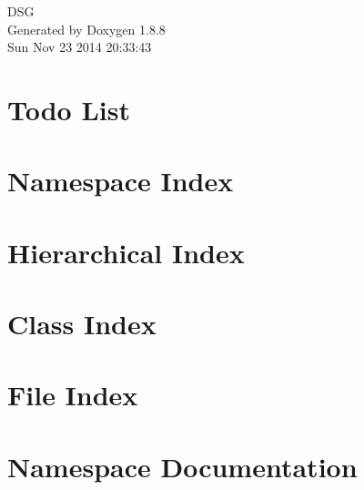 \documentclass[twoside]{book}
\newcommand{\+}{\discretionary{\mbox{\scriptsize$\hookleftarrow$}}{}{}}
\newcommand{\clearemptydoublepage}{%
  \newpage{\pagestyle{empty}\cleardoublepage}%
}
\begin{document}
\hypersetup{pageanchor=false,
             bookmarks=true,
             bookmarksnumbered=true,
             pdfencoding=unicode
            }
\begin{titlepage}
\vspace*{7cm}
\begin{center}%
{\Large D\+S\+G }\\
\vspace*{1cm}
{\large Generated by Doxygen 1.8.8}\\
\vspace*{0.5cm}
{\small Sun Nov 23 2014 20:33:43}\\
\end{center}
\end{titlepage}
\clearemptydoublepage
\tableofcontents
\clearemptydoublepage
{}
\hypersetup{pageanchor=true}

\chapter{Todo List}
\label{todo}
\hypertarget{todo}{}

\chapter{Namespace Index}

\chapter{Hierarchical Index}

\chapter{Class Index}

\chapter{File Index}

\chapter{Namespace Documentation}









\end{document}
